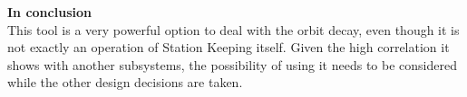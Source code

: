 \textbf{In conclusion\\}
This tool is a very powerful option to deal with the orbit decay, even though it is not exactly an operation of Station Keeping itself. Given the high correlation it shows with another subsystems, the possibility of using it needs to be considered while the other design decisions are taken.